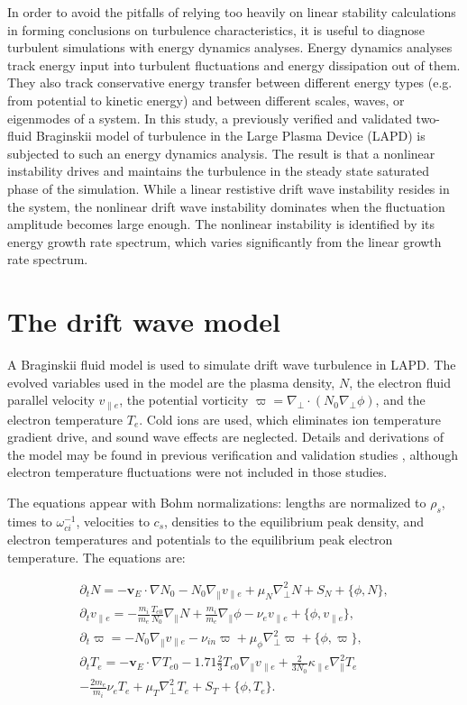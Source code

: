 \documentclass[12pt]{article}
\def\beqar{\begin{eqnarray}}
\def\eeqar{\end{eqnarray}}
\newcommand{\pdt}{\partial_t}
\def\grad{\nabla}
\newcommand{\gradpar}{\grad_\parallel}
\newcommand{\gradperp}{\grad_\perp}
\newcommand{\vpe}{v_{\parallel e}}
\newcommand{\nue}{\nu_{e}}
\newcommand{\nuin}{\nu_{in}}
\newcommand{\kpe}{\kappa_{\parallel e}}
\newcommand{\fmie}{\frac{m_i}{m_e}}
\begin{document}
In order to avoid the pitfalls of relying too heavily on linear stability calculations in forming conclusions on turbulence characteristics, it is useful to diagnose turbulent simulations
with energy dynamics analyses. Energy dynamics analyses track energy input into turbulent fluctuations and energy dissipation out of them. They also track conservative energy transfer
between different energy types (e.g. from potential to kinetic energy) and between different scales, waves, or eigenmodes of a system. In this study, a previously verified and validated
two-fluid Braginskii model of turbulence in the Large Plasma Device (LAPD) is subjected to such an energy dynamics analysis. The result is that a nonlinear instability drives and maintains
the turbulence in the steady state saturated phase of the simulation. While a linear restistive drift wave instability resides in the system, the nonlinear drift wave instability dominates
when the fluctuation amplitude becomes large enough. The nonlinear instability is identified by its energy growth rate spectrum, which varies significantly from the linear growth rate spectrum.


\section{The drift wave model}
\label{dw_model}

A Braginskii fluid model \cite{Braginskii1965} is used to simulate drift wave turbulence in LAPD. 
The evolved variables used in the model are the plasma density, $N$, the electron fluid parallel velocity $\vpe$, the potential vorticity $\varpi = \gradperp \cdot (N_0 \gradperp \phi)$,
and the electron temperature $T_e$. Cold ions are used, which eliminates ion temperature gradient drive, and sound wave effects are neglected. Details and derivations of the model
may be found in previous verification and validation studies \cite{Popovich2010a,Popovich2010b,Umansky2011}, although electron temperature fluctuations were not included in those studies.

The equations appear with Bohm normalizations: lengths are normalized to $\rho_s$, times to $\omega_{ci}^{-1}$, velocities to $c_s$, densities to the equilibrium peak density, and electron
temperatures and potentials to the equilibrium peak electron temperature. The equations are:

\beqar
\label{ni_eq}
\pdt N = - {\mathbf v_E} \cdot \grad N_0 - N_0 \gradpar \vpe + \mu_N \gradperp^2 N + S_N + \{\phi,N\}, \\
\label{ve_eq}
\pdt \vpe = - \fmie \frac{T_{e0}}{N_0} \gradpar N + \fmie \gradpar \phi - \nue \vpe + \{\phi,\vpe \}, \\
\label{rho_eq}
\pdt \varpi = - N_0 \gradpar \vpe  - \nuin \varpi + \mu_\phi \gradperp^2 \varpi + \{\phi,\varpi \}, \\
\label{te_eq}
\pdt T_e = - {\mathbf v_E} \cdot \grad T_{e0} - 1.71 \frac{2}{3} T_{e0} \gradpar \vpe + \frac{2}{3 N_0} \kpe \gradpar^2 T_e  \nonumber \\
- \frac{2 m_e}{m_i} \nue T_e  + \mu_T \gradperp^2 T_e +  S_T + \{\phi,T_e\}.
\eeqar
\end{document}
